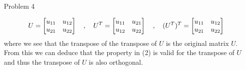 \begin{problem}{Problem 4}
\begin{Highlight}[Solution]
        \begin{equation}
            U = 
            \begin{bmatrix}
                u_{11} & u_{12} \\
                u_{21} & u_{22} \\
            \end{bmatrix}
            \hspace*{10pt} , \hspace*{10pt}
            U^{T} = 
            \begin{bmatrix}
                u_{11} & u_{21} \\
                u_{12} & u_{22} \\
            \end{bmatrix}
            \hspace*{10pt} , \hspace*{10pt}
            (U^{T})^{T} = 
            \begin{bmatrix}
                u_{11} & u_{12} \\
                u_{21} & u_{22} \\
            \end{bmatrix}
        \end{equation}
        where we see that the transpose of the transpose of $U$ is the original matrix $U$. From this we can deduce that the property in (2) is valid for the transpose of $U$ and thus the transpose of 
        $U$ is also orthogonal.
    \end{Highlight}
\end{problem}

